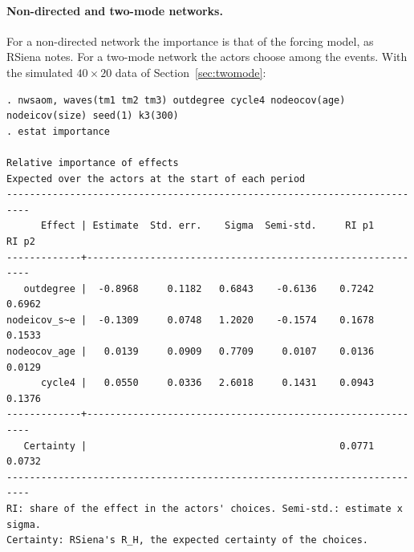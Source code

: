 \paragraph{Non-directed and two-mode networks.} For a non-directed network the importance is that of the forcing model, as RSiena notes. For a two-mode network the actors choose among the events. With the simulated $40\times20$ data of Section~\ref{sec:twomode}:
\begin{lstlisting}
. nwsaom, waves(tm1 tm2 tm3) outdegree cycle4 nodeocov(age) nodeicov(size) seed(1) k3(300)
. estat importance

Relative importance of effects
Expected over the actors at the start of each period
--------------------------------------------------------------------------
      Effect | Estimate  Std. err.    Sigma  Semi-std.     RI p1     RI p2
-------------+------------------------------------------------------------
   outdegree |  -0.8968     0.1182   0.6843    -0.6136    0.7242    0.6962
nodeicov_s~e |  -0.1309     0.0748   1.2020    -0.1574    0.1678    0.1533
nodeocov_age |   0.0139     0.0909   0.7709     0.0107    0.0136    0.0129
      cycle4 |   0.0550     0.0336   2.6018     0.1431    0.0943    0.1376
-------------+------------------------------------------------------------
   Certainty |                                            0.0771    0.0732
--------------------------------------------------------------------------
RI: share of the effect in the actors' choices. Semi-std.: estimate x sigma.
Certainty: RSiena's R_H, the expected certainty of the choices.
\end{lstlisting}
